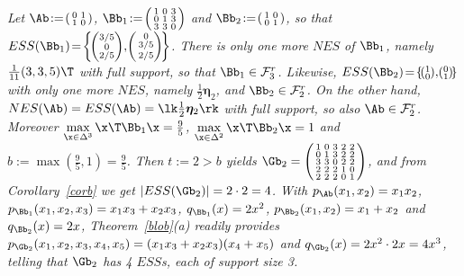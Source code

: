 \documentclass[moor]{informs3}              %
\begin{document}
\begin{exa}
\emph{Let $\Ab\!:=\!\left(\begin{smallmatrix}0&1\\1&0\end{smallmatrix}\right)$, $\Bb_1\!:=\!\left(\begin{smallmatrix}1&0&3\\0&1&3\\3&3&0\end{smallmatrix}\right)$ and $\Bb_2\!:=\!\left(\begin{smallmatrix}1&0\\0&1\end{smallmatrix}\right)$,
so that $ESS(\Bb_1)\!=\!\left\{\!\left(\!\begin{smallmatrix}3/5\\0\\2/5\end{smallmatrix}\!\right)\!,\!\left(\begin{smallmatrix}0\\3/5\\2/5\end{smallmatrix}\!\right)\!\right\}$.
There is only one more $NES$ of $\Bb_1$, namely $\frac 1{11}(3,3,5)\T$ with full support, so that $\Bb_1\in {\mathcal F}^r_3 $. Likewise, $ESS(\Bb_2)\!=\!\left\{\!\left(\!\begin{smallmatrix}1\\0\end{smallmatrix}\!\right)\!,\!\left(\!\begin{smallmatrix}0\\1\end{smallmatrix}\!\right)\!\right\}$
with only one more $NES$, namely $\frac 12 {\bm\eta}_2$, and $\Bb_2\in  {\mathcal F}^r_2 $. On the other hand, $NES(\Ab)=ESS(\Ab) = \lk \frac 12 {\bm\eta}_2\rk $ with full support, so also $\Ab\in  {\mathcal F}^r_2 $.
Moreover $\max\limits_{\x\in\Delta^{3}}\x\T\Bb_1\x=\tfrac95$, $\max\limits_{\x\in\Delta^{2}}\x\T\Bb_2\x=1$ and $b:=\max(\tfrac95,1)=\tfrac95$. Then $t:=2>b$ yields
$\Gb_2=\left(\begin{smallmatrix}1&0&3&2&2\\0&1&3&2&2\\3&3&0&2&2\\2&2&2&1&0\\2&2&2&0&1\end{smallmatrix}\right)$, and from Corollary~\ref{corb} we get $|ESS(\Gb_2)|=2\cdot2=4$.
With $p_\Ab(x_1,x_2)=x_1x_2$, $p_{\Bb_1}(x_1,x_2,x_3)=x_1x_3+x_2x_3$, $q_{\Bb_1}(x)=2x^2$, $p_{\Bb_2}(x_1,x_2)=x_1+x_2$ and $q_{\Bb_2}(x)=2x$, Theorem~\ref{blob}(a) readily provides
$p_{\Gb_2}(x_1,x_2,x_3,x_4,x_5)=(x_1x_3+x_2x_3)(x_4+x_5)$ and $q_{\Gb_2}(x)=2x^2\cdot2x=4x^3$, telling that $\Gb_2$ has 4 $ESS$s, each of support size 3.}
\end{exa}
\end{document}
